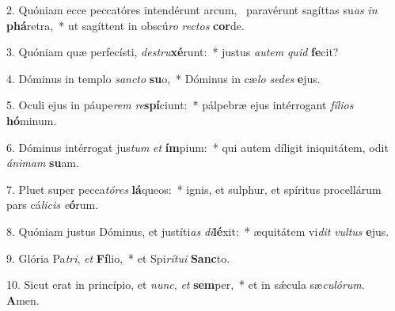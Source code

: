 2. Quóniam ecce peccatóres intendérunt arcum, \dag\  paravérunt sagíttas su\textit{as} \textit{in} \textbf{phá}retra,~*  ut sagíttent in obscú\textit{ro} \textit{rec}\textit{tos} \textbf{cor}de.\

3. Quóniam quæ perfecísti, \textit{de}\textit{stru}\textbf{xé}runt:~*  justus \textit{au}\textit{tem} \textit{quid} \textbf{fe}cit?\

4. Dóminus in templo \textit{sanc}\textit{to} \textbf{su}o,~*  Dóminus in cæ\textit{lo} \textit{se}\textit{des} \textbf{e}jus.\

5. Oculi ejus in páupe\textit{rem} \textit{re}\textbf{spí}ciunt:~*  pálpebræ ejus intérrogant \textit{fí}\textit{li}\textit{os} \textbf{hó}minum.\

6. Dóminus intérrogat jus\textit{tum} \textit{et} \textbf{ím}pium:~*  qui autem díligit iniquitátem, odit \textit{á}\textit{ni}\textit{mam} \textbf{su}am.\

7. Pluet super pecca\textit{tó}\textit{res} \textbf{lá}queos:~*  ignis, et sulphur, et spíritus procellárum pars cá\textit{li}\textit{cis} \textit{e}\textbf{ó}rum.\

8. Quóniam justus Dóminus, et justíti\textit{as} \textit{di}\textbf{lé}xit:~*  æquitátem vi\textit{dit} \textit{vul}\textit{tus} \textbf{e}jus.\

9. Glória Pa\textit{tri}, \textit{et} \textbf{Fí}lio,~*  et Spi\textit{rí}\textit{tu}\textit{i} \textbf{Sanc}to.\

10. Sicut erat in princípio, et \textit{nunc}, \textit{et} \textbf{sem}per,~*  et in sǽcula sæ\textit{cu}\textit{ló}\textit{rum}. \textbf{A}men.\

